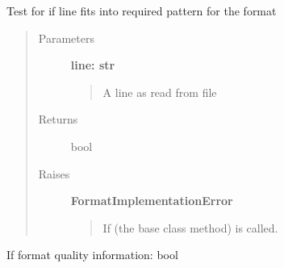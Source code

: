 \documentclass[letterpaper,10pt,english]{sphinxmanual}
\begin{document}
\begin{fulllineitems}

\begin{fulllineitems}
\label{fseq.reading:fseq.reading.seq_encoder.FastQ.QUALITY_LINE}
\end{fulllineitems}


\begin{fulllineitems}
\label{fseq.reading:fseq.reading.seq_encoder.FastQ.SEQUENCE_LINE}
\end{fulllineitems}


\begin{fulllineitems}
\label{fseq.reading:fseq.reading.seq_encoder.FastQ.expects}
Test for if line fits into required pattern for the format
\begin{quote}\begin{description}
\item[{Parameters}] \leavevmode
\textbf{line: str}
\begin{quote}

A line as read from file
\end{quote}

\item[{Returns}] \leavevmode
bool

\item[{Raises}] \leavevmode
\textbf{FormatImplementationError}
\begin{quote}

If  (the base class method) is called.
\end{quote}

\end{description}\end{quote}

\end{fulllineitems}


\begin{fulllineitems}
\label{fseq.reading:fseq.reading.seq_encoder.FastQ.hasQuality}
If format quality information: bool


\end{fulllineitems}
\end{fulllineitems}
\end{document}
